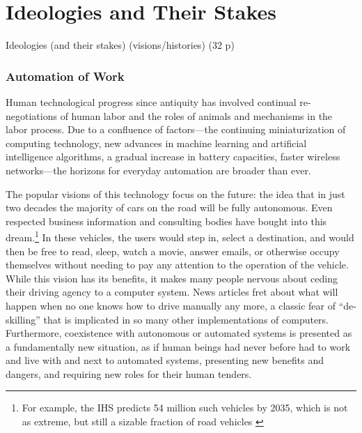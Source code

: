 \chapter{Ideologies and Their Stakes}

Ideologies (and their stakes) (visions/histories) (32 p)

\subsection{Automation of Work}

Human technological progress since antiquity has
involved continual re-negotiations of human labor and the roles of
animals and mechanisms in the labor process. Due to a confluence
of factors---the continuing miniaturization of computing technology, new
advances in machine learning and artificial intelligence algorithms, a
gradual increase in battery capacities, faster wireless networks---the
horizons for everyday automation are broader than ever. 

The popular visions of this technology focus on the future: the
idea that in just two decades the majority of cars on the road will be
fully autonomous. Even respected business information and consulting
bodies have bought into this dream.\footnote{For example, the IHS
  predicts 54 million such vehicles by 2035, which is not as extreme,
  but still a sizable fraction of road vehicles \cite{IHSstudy}} In these vehicles, the users would
step in, select a destination, and would then be free to read, sleep,
watch a movie, answer emails, or otherwise occupy themselves without
needing to pay any attention to the operation of the vehicle. While this
vision has its benefits, it makes many people nervous about
ceding their driving agency to a computer system.\cite{clytton} News articles fret
about what will happen when no one knows how to drive manually any
more,\cite{pross} a classic fear of ``de-skilling'' that is implicated in so many
other implementations of computers. Furthermore, coexistence with
autonomous or automated systems is presented as a fundamentally new
situation, as if human beings had never before had to work and live
with and next to automated systems, presenting new benefits and
dangers, and requiring new roles for their human tenders.

